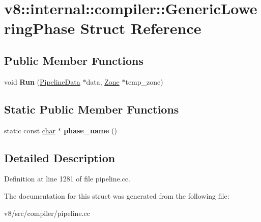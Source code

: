 \hypertarget{structv8_1_1internal_1_1compiler_1_1GenericLoweringPhase}{}\section{v8\+:\+:internal\+:\+:compiler\+:\+:Generic\+Lowering\+Phase Struct Reference}
\label{structv8_1_1internal_1_1compiler_1_1GenericLoweringPhase}
\subsection*{Public Member Functions}
\begin{DoxyCompactItemize}
\item 
\mbox{\label{structv8_1_1internal_1_1compiler_1_1GenericLoweringPhase_a6141cd4ab00de8adc99d15979b02e760}} 
void {\bfseries Run} (\mbox{\hyperlink{classv8_1_1internal_1_1compiler_1_1PipelineData}{Pipeline\+Data}} $\ast$data, \mbox{\hyperlink{classv8_1_1internal_1_1Zone}{Zone}} $\ast$temp\+\_\+zone)
\end{DoxyCompactItemize}
\subsection*{Static Public Member Functions}
\begin{DoxyCompactItemize}
\item 
\mbox{\label{structv8_1_1internal_1_1compiler_1_1GenericLoweringPhase_a73e9e94143a738239a6fc843d0c7d354}} 
static const \mbox{\hyperlink{classchar}{char}} $\ast$ {\bfseries phase\+\_\+name} ()
\end{DoxyCompactItemize}


\subsection{Detailed Description}


Definition at line 1281 of file pipeline.\+cc.



The documentation for this struct was generated from the following file\+:\begin{DoxyCompactItemize}
\item 
v8/src/compiler/pipeline.\+cc\end{DoxyCompactItemize}
